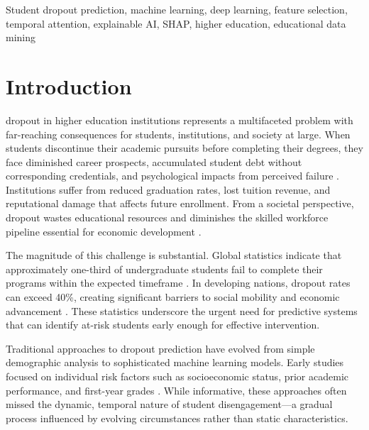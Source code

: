 \documentclass[journal]{IEEEtran}
\begin{document}
\begin{IEEEkeywords}
Student dropout prediction, machine learning, deep learning, feature selection, temporal attention, explainable AI, SHAP, higher education, educational data mining
\end{IEEEkeywords}

\section{Introduction}

 dropout in higher education institutions represents a multifaceted problem with far-reaching consequences for students, institutions, and society at large. When students discontinue their academic pursuits before completing their degrees, they face diminished career prospects, accumulated student debt without corresponding credentials, and psychological impacts from perceived failure \cite{tinto1975dropout}. Institutions suffer from reduced graduation rates, lost tuition revenue, and reputational damage that affects future enrollment. From a societal perspective, dropout wastes educational resources and diminishes the skilled workforce pipeline essential for economic development \cite{dekker2009predicting}.

The magnitude of this challenge is substantial. Global statistics indicate that approximately one-third of undergraduate students fail to complete their programs within the expected timeframe \cite{oecd2019education}. In developing nations, dropout rates can exceed 40\%, creating significant barriers to social mobility and economic advancement \cite{worldbank2020education}. These statistics underscore the urgent need for predictive systems that can identify at-risk students early enough for effective intervention.

Traditional approaches to dropout prediction have evolved from simple demographic analysis to sophisticated machine learning models. Early studies focused on individual risk factors such as socioeconomic status, prior academic performance, and first-year grades \cite{tinto1993leaving}. While informative, these approaches often missed the dynamic, temporal nature of student disengagement---a gradual process influenced by evolving circumstances rather than static characteristics.
\end{document}
